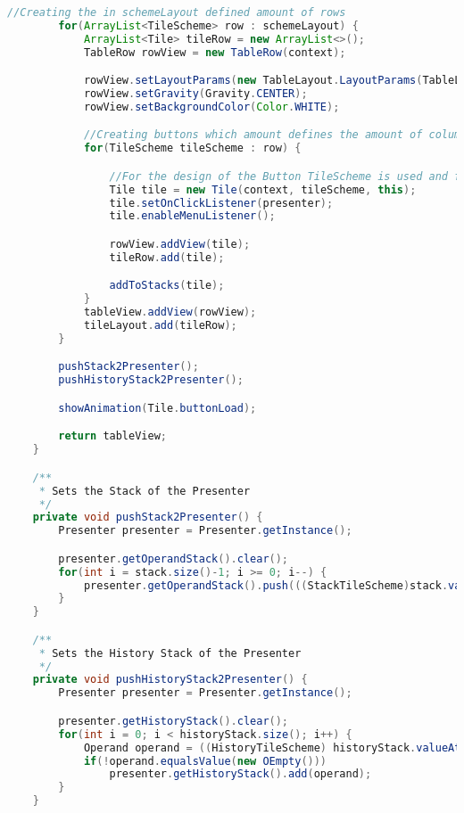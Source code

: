 \begin{lstlisting}[caption=TileLayout,label=list:TileLayout,language=Java]
        //Creating the in schemeLayout defined amount of rows
        for(ArrayList<TileScheme> row : schemeLayout) {
            ArrayList<Tile> tileRow = new ArrayList<>();
            TableRow rowView = new TableRow(context);

            rowView.setLayoutParams(new TableLayout.LayoutParams(TableLayout.LayoutParams.MATCH_PARENT, TableLayout.LayoutParams.MATCH_PARENT, 1.0f));
            rowView.setGravity(Gravity.CENTER);
            rowView.setBackgroundColor(Color.WHITE);

            //Creating buttons which amount defines the amount of columns
            for(TileScheme tileScheme : row) {

                //For the design of the Button TileScheme is used and for the button itself Tile
                Tile tile = new Tile(context, tileScheme, this);
                tile.setOnClickListener(presenter);
                tile.enableMenuListener();

                rowView.addView(tile);
                tileRow.add(tile);

                addToStacks(tile);
            }
            tableView.addView(rowView);
            tileLayout.add(tileRow);
        }

        pushStack2Presenter();
        pushHistoryStack2Presenter();

        showAnimation(Tile.buttonLoad);

        return tableView;
    }

    /**
     * Sets the Stack of the Presenter
     */
    private void pushStack2Presenter() {
        Presenter presenter = Presenter.getInstance();

        presenter.getOperandStack().clear();
        for(int i = stack.size()-1; i >= 0; i--) {
            presenter.getOperandStack().push(((StackTileScheme)stack.valueAt(i).getScheme()).getOperand());
        }
    }

    /**
     * Sets the History Stack of the Presenter
     */
    private void pushHistoryStack2Presenter() {
        Presenter presenter = Presenter.getInstance();

        presenter.getHistoryStack().clear();
        for(int i = 0; i < historyStack.size(); i++) {
            Operand operand = ((HistoryTileScheme) historyStack.valueAt(i).getScheme()).getOperand();
            if(!operand.equalsValue(new OEmpty()))
                presenter.getHistoryStack().add(operand);
        }
    }


\end{lstlisting}
